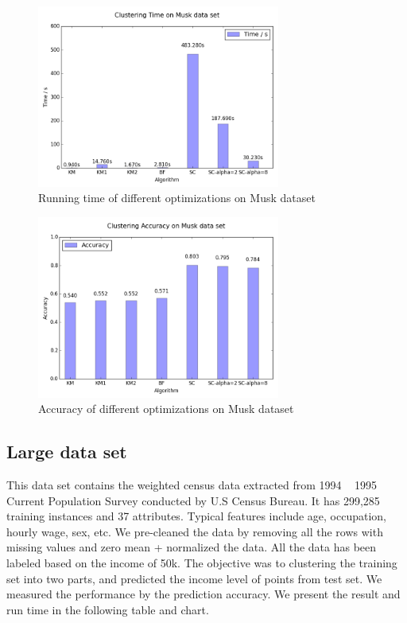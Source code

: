 \documentclass{acm_proc_article-sp}
\begin{document}
\begin{figure}
\centering
\includegraphics[height=6cm]{mt.png}
\caption{Running time of different optimizations on Musk dataset}
\label{figure_musk_time}
\end{figure}

\begin{figure}
\centering
\includegraphics[height=6cm]{ma.png}
\caption{Accuracy of different optimizations on Musk dataset}
\label{figure_musk_accu}
\end{figure}

\subsection{Large data set}
This data set contains the weighted census data extracted from 1994 ~ 1995 Current Population Survey conducted by U.S Census Bureau. It has 299,285 training instances and 37 attributes. Typical features include age, occupation, hourly wage, sex, etc. We pre-cleaned the data by removing all the rows with missing values and zero mean + normalized the data. All the data has been labeled based on the income of 50k. The objective was to clustering the training set into two parts, and predicted the income level of points from test set. We measured the performance by the prediction accuracy.
We present the result and run time in the following table and chart.
\end{document}
